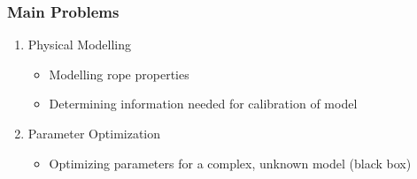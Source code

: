 \begin{frame}[c]
	\frametitle{Main Problems}
		\begin{enumerate}
			\item{Physical Modelling}
				\begin{itemize}
					\item{Modelling rope properties}
					\item{Determining information needed for calibration of model}
				\end{itemize}
			\vspace{0.5cm}
			\item{Parameter Optimization}
				\begin{itemize}
					\item{Optimizing parameters for a complex, unknown model (black box)}
				\end{itemize}
		\end{enumerate}
\end{frame}


